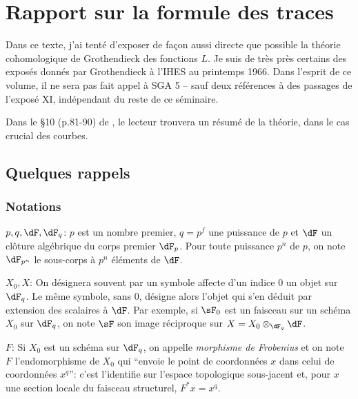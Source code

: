 
\chapter{Rapport sur la formule des traces}\label{II}

Dans ce texte, j'ai tenté d'exposer de façon aussi directe que possible la 
théorie cohomologique de Grothendieck des fonctions $L$. Je suis de très près 
certains des exposés donnés par Grothendieck à l'IHES au printemps 1966. Dans 
l'esprit de ce volume, il ne sera pas fait appel à SGA 5 -- sauf deux 
références à des passages de l'exposé XI, indépendant du reste de ce 
séminaire. 

Dans le \S 10 (p.81-90) de \cite{de73}, le lecteur trouvera un résumé de la 
théorie, dans le cas crucial des courbes. 










\section{Quelques rappels}\label{II:1}





\subsection{Notations}\label{II:1-1}

$p,q,\dF,\dF_q$: $p$ est un nombre premier, $q=p^f$ une puissance de $p$ et 
$\dF$ un clôture algébrique du corps premier $\dF_p$. Pour toute puissance 
$p^n$ de $p$, on note $\dF_{p^n}$ le sous-corps à $p^n$ éléments de $\dF$. 

$X_0,X$: On désignera souvent par un symbole affecte d'un indice $0$ un objet 
sur $\dF_q$. Le même symbole, sans $0$, désigne alors l'objet qui s'en déduit 
par extension des scalaires à $\dF$. Par exemple, si $\sF_0$ est un faisceau 
sur un schéma $X_0$ sur $\dF_q$, on note $\sF$ son image réciproque sur 
$X=X_0\otimes_{\dF_q} \dF$. 

$F$: Si $X_0$ est un schéma sur $\dF_q$, on appelle \emph{morphisme de 
Frobenius} et on note $F$ l'endomorphisme de $X_0$ qui ``envoie le point de 
coordonnées $x$ dans celui de coordonnées $x^q$'': c'est l'identifie sur 
l'espace topologique sous-jacent et, pour $x$ une section locale du faisceau 
structurel, $F^* x = x^q$. 

